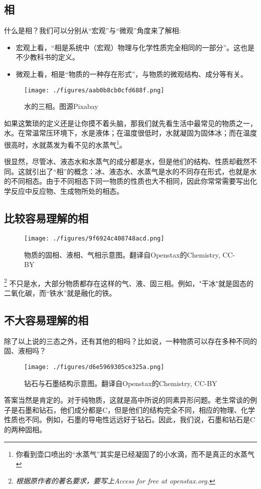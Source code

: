 
\subsection{相}
什么是相？我们可以分别从“宏观”与“微观”角度来了解相:
\begin{itemize}
\item 宏观上看，“相是系统中（宏观）物理与化学性质完全相同的一部分”。这也是不少教科书的定义。
\item 微观上看，相是“物质的一种存在形式”，与物质的微观结构、成分等有关。
\end{itemize}

\begin{figure}[ht]
\centering
\texttt{[image: ./figures/aab0b8cb0cfd688f.png]}
\caption{水的三相。图源Pixabay} \label{fig_PHS_1}
\end{figure}
如果这繁琐的定义还是让你摸不着头脑，那我们就先看生活中最常见的物质之一，水。在常温常压环境下，水是液体；在温度很低时，水就凝固为固体冰；而在温度很高时，水就蒸发为看不见的水蒸气\footnote{你看到壶口喷出的“水蒸气”其实是已经凝固了的小水滴，而不是真正的水蒸气}。

很显然，尽管冰、液态水和水蒸气的成分都是水，但是他们的结构、性质却截然不同。这就引出了“相”的概念：冰、液态水、水蒸气是水的不同存在形式，也就是水的不同相态。由于不同相态下同一物质的性质也大不相同，因此你常常需要写出化学反应中反应物、生成物所处的相态。

\subsection{比较容易理解的相}
\begin{figure}[ht]
\centering
\texttt{[image: ./figures/9f6924c408748acd.png]}
\caption{物质的固相、液相、气相示意图。翻译自Openstax的Chemistry, CC-BY} \label{fig_PHS_2}
\end{figure}
\footnote{\textsl{根据原作者的著名要求，要写上Access for free at openstax.org.}}
不只是水，大部分物质都存在这样的气、液、固三相。例如，"干冰"就是固态的二氧化碳，而“铁水”就是融化的铁。

\subsection{不大容易理解的相}
除了以上说的三态之外，还有其他的相吗？比如说，一种物质可以存在多种不同的固、液相吗？

\begin{figure}[ht]
\centering
\texttt{[image: ./figures/d6e5969305ce325a.png]}
\caption{钻石与石墨结构示意图。翻译自Openstax的Chemistry, CC-BY} \label{fig_PHS_3}
\end{figure}
答案当然是肯定的。对于纯物质，这就是高中所说的同素异形问题。老生常谈的例子是石墨和钻石，他们成分都是C，但是他们的结构完全不同，相应的物理、化学性质也不同。例如，石墨的导电性远远好于钻石。因此，我们说，石墨和钻石是C的两种固相。


